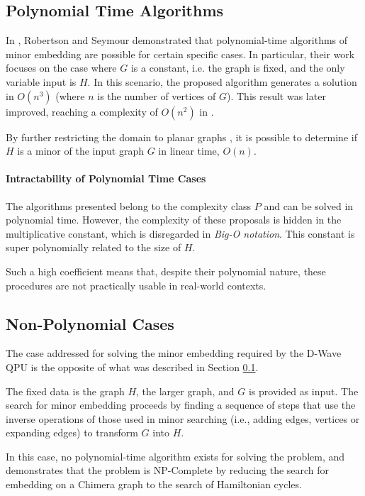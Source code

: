 \subsection{Polynomial Time Algorithms}\label{sec:mepoly}

In \cite{MEPoly}, Robertson and Seymour demonstrated that polynomial-time algorithms of minor embedding are possible for certain specific cases. 
In particular, their work focuses on the case where $G$ is a constant, i.e. the graph is fixed, and the only variable input is $H$. 
In this scenario, the proposed algorithm generates a solution in $O(n^3)$ (where $n$ is the number of vertices of $G$). 
This result was later improved, reaching a complexity of $O(n^2)$ in \cite{MEPoly2}.

By further restricting the domain to planar graphs \cite{MEPoly3}, it is possible to determine if $H$ is a minor of the input graph $G$ in linear time, $O(n)$.

\paragraph{Intractability of Polynomial Time Cases} The algorithms presented belong to the complexity class $P$ and can be solved in polynomial time. 
However, the complexity of these proposals is hidden in the multiplicative constant, which is disregarded in \emph{Big-O notation}. 
This constant is super polynomially related to the size of $H$.

Such a high coefficient means that, despite their polynomial nature, these procedures are not practically usable in real-world contexts.

\subsection{Non-Polynomial Cases}\label{sec:menopoly}

The case addressed for solving the minor embedding required by the D-Wave QPU is the opposite of what was described in Section \ref{sec:mepoly}.

The fixed data is the graph $H$, the larger graph, and $G$ is provided as input. 
The search for minor embedding proceeds by finding a sequence of steps that use the inverse operations of those used in minor searching (i.e., adding edges, vertices or expanding edges) to transform $G$ into $H$.

In this case, no polynomial-time algorithm exists for solving the problem, and \cite{MENP} demonstrates that the problem is NP-Complete by reducing the search for embedding on a Chimera graph \cite{QPU} to the search of Hamiltonian cycles.

